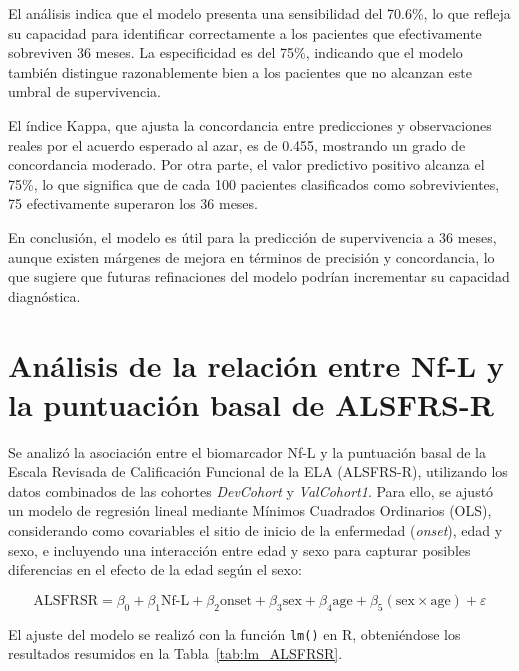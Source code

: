 \documentclass[12pt]{article} %
\begin{document}
El análisis indica que el modelo presenta una sensibilidad del 70.6\%, lo que refleja su capacidad para identificar correctamente a los pacientes que efectivamente sobreviven 36 meses. La especificidad es del 75\%, indicando que el modelo también distingue razonablemente bien a los pacientes que no alcanzan este umbral de supervivencia. 

El índice Kappa, que ajusta la concordancia entre predicciones y observaciones reales por el acuerdo esperado al azar, es de 0.455, mostrando un grado de concordancia moderado. Por otra parte, el valor predictivo positivo alcanza el 75\%, lo que significa que de cada 100 pacientes clasificados como sobrevivientes, 75 efectivamente superaron los 36 meses.

En conclusión, el modelo es útil para la predicción de supervivencia a 36 meses, aunque existen márgenes de mejora en términos de precisión y concordancia, lo que sugiere que futuras refinaciones del modelo podrían incrementar su capacidad diagnóstica.

\section{Análisis de la relación entre Nf-L y la puntuación basal de ALSFRS-R}

Se analizó la asociación entre el biomarcador Nf-L y la puntuación basal de la Escala Revisada de Calificación Funcional de la ELA (ALSFRS-R), utilizando los datos combinados de las cohortes \textit{DevCohort} y \textit{ValCohort1}. Para ello, se ajustó un modelo de regresión lineal mediante Mínimos Cuadrados Ordinarios (OLS), considerando como covariables el sitio de inicio de la enfermedad (\textit{onset}), edad y sexo, e incluyendo una interacción entre edad y sexo para capturar posibles diferencias en el efecto de la edad según el sexo:

\[
\text{ALSFRSR} = \beta_0 + \beta_1 \text{Nf-L} + \beta_2 \text{onset} + \beta_3 \text{sex} + \beta_4 \text{age} + \beta_5 (\text{sex} \times \text{age}) + \varepsilon
\]

El ajuste del modelo se realizó con la función \texttt{lm()} en R, obteniéndose los resultados resumidos en la Tabla~\ref{tab:lm_ALSFRSR}.
\end{document}
